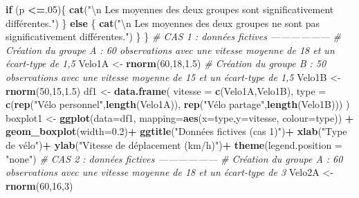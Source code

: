 \documentclass[
  11pt,
  french,
]{book}
\makeatletter
\newenvironment{Shaded}{\begin{snugshade}}{\end{snugshade}}
\newcommand{\CharTok}[1]{\textcolor[rgb]{0.31,0.60,0.02}{#1}}
\newcommand{\CommentTok}[1]{\textcolor[rgb]{0.56,0.35,0.01}{\textit{#1}}}
\newcommand{\ControlFlowTok}[1]{\textcolor[rgb]{0.13,0.29,0.53}{\textbf{#1}}}
\newcommand{\DataTypeTok}[1]{\textcolor[rgb]{0.13,0.29,0.53}{#1}}
\newcommand{\DecValTok}[1]{\textcolor[rgb]{0.00,0.00,0.81}{#1}}
\newcommand{\FloatTok}[1]{\textcolor[rgb]{0.00,0.00,0.81}{#1}}
\newcommand{\KeywordTok}[1]{\textcolor[rgb]{0.13,0.29,0.53}{\textbf{#1}}}
\newcommand{\NormalTok}[1]{#1}
\newcommand{\OperatorTok}[1]{\textcolor[rgb]{0.81,0.36,0.00}{\textbf{#1}}}
\newcommand{\StringTok}[1]{\textcolor[rgb]{0.31,0.60,0.02}{#1}}
\newenvironment{kframe}{%
\medskip{}
\setlength{\fboxsep}{.8em}
 \def\at@end@of@kframe{}%
 \ifinner\ifhmode%
  \def\at@end@of@kframe{\end{minipage}}%
  \begin{minipage}{\columnwidth}%
 \fi\fi%
 \def\FrameCommand##1{\hskip\@totalleftmargin \hskip-\fboxsep
 \colorbox{shadecolor}{##1}\hskip-\fboxsep
     \hskip-\linewidth \hskip-\@totalleftmargin \hskip\columnwidth}%
 \MakeFramed {\advance\hsize-\width
   \@totalleftmargin\z@ \linewidth\hsize
   \@setminipage}}%
 {\par\unskip\endMakeFramed%
 \at@end@of@kframe}
\renewenvironment{Shaded}{\begin{kframe}}{\end{kframe}}
\makeatother
\begin{document}
\begin{Shaded}
\begin{Highlighting}[]
    \ControlFlowTok{if}\NormalTok{ (p }\OperatorTok{<=}\NormalTok{.}\DecValTok{05}\NormalTok{)\{}
      \KeywordTok{cat}\NormalTok{(}\StringTok{"}\CharTok{\textbackslash{}n}\StringTok{ Les moyennes des deux groupes sont significativement différentes."}\NormalTok{)}
\NormalTok{    \} }\ControlFlowTok{else}\NormalTok{ \{}
      \KeywordTok{cat}\NormalTok{(}\StringTok{"}\CharTok{\textbackslash{}n}\StringTok{ Les moyennes des deux groupes ne sont pas significativement différentes."}\NormalTok{)}
\NormalTok{    \}}
\NormalTok{\}}
\CommentTok{# CAS 1 : données fictives ------------------}
\CommentTok{# Création du groupe A : 60 observations avec une vitesse moyenne de 18 et un écart-type de 1,5}
\NormalTok{Velo1A <-}\StringTok{ }\KeywordTok{rnorm}\NormalTok{(}\DecValTok{60}\NormalTok{,}\DecValTok{18}\NormalTok{,}\FloatTok{1.5}\NormalTok{)}
\CommentTok{# Création du groupe B : 50 observations avec une vitesse moyenne de 15 et un écart-type de 1,5}
\NormalTok{Velo1B <-}\StringTok{ }\KeywordTok{rnorm}\NormalTok{(}\DecValTok{50}\NormalTok{,}\DecValTok{15}\NormalTok{,}\FloatTok{1.5}\NormalTok{)}
\NormalTok{df1 <-}\StringTok{ }\KeywordTok{data.frame}\NormalTok{(}
  \DataTypeTok{vitesse =} \KeywordTok{c}\NormalTok{(Velo1A,Velo1B), }
  \DataTypeTok{type =} \KeywordTok{c}\NormalTok{(}\KeywordTok{rep}\NormalTok{(}\StringTok{"Vélo personnel"}\NormalTok{,}\KeywordTok{length}\NormalTok{(Velo1A)), }\KeywordTok{rep}\NormalTok{(}\StringTok{"Vélo partage"}\NormalTok{,}\KeywordTok{length}\NormalTok{(Velo1B)))}
\NormalTok{)}
\NormalTok{boxplot1 <-}\StringTok{ }\KeywordTok{ggplot}\NormalTok{(}\DataTypeTok{data=}\NormalTok{df1, }\DataTypeTok{mapping=}\KeywordTok{aes}\NormalTok{(}\DataTypeTok{x=}\NormalTok{type,}\DataTypeTok{y=}\NormalTok{vitesse, }\DataTypeTok{colour=}\NormalTok{type)) }\OperatorTok{+}
\StringTok{  }\KeywordTok{geom_boxplot}\NormalTok{(}\DataTypeTok{width=}\FloatTok{0.2}\NormalTok{)}\OperatorTok{+}
\StringTok{  }\KeywordTok{ggtitle}\NormalTok{(}\StringTok{"Données fictives (cas 1)"}\NormalTok{)}\OperatorTok{+}
\StringTok{  }\KeywordTok{xlab}\NormalTok{(}\StringTok{"Type de vélo"}\NormalTok{)}\OperatorTok{+}
\StringTok{  }\KeywordTok{ylab}\NormalTok{(}\StringTok{"Vitesse de déplacement (km/h)"}\NormalTok{)}\OperatorTok{+}
\StringTok{  }\KeywordTok{theme}\NormalTok{(}\DataTypeTok{legend.position =} \StringTok{"none"}\NormalTok{)}
\CommentTok{# CAS 2 : données fictives ------------------}
\CommentTok{# Création du groupe A : 60 observations avec une vitesse moyenne de 18 et un écart-type de 3}
\NormalTok{Velo2A <-}\StringTok{ }\KeywordTok{rnorm}\NormalTok{(}\DecValTok{60}\NormalTok{,}\DecValTok{16}\NormalTok{,}\DecValTok{3}\NormalTok{)}

\end{Highlighting}
\end{Shaded}
\end{document}
